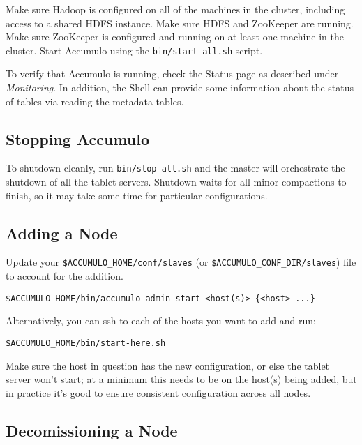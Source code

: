 Make sure Hadoop is configured on all of the machines in the cluster, including
access to a shared HDFS instance. Make sure HDFS and ZooKeeper are running.
Make sure ZooKeeper is configured and running on at least one machine in the
cluster.
Start Accumulo using the \texttt{bin/start-all.sh} script.

To verify that Accumulo is running, check the Status page as described under
\emph{Monitoring}. In addition, the Shell can provide some information about the status of
tables via reading the metadata tables.

\subsection{Stopping Accumulo}

To shutdown cleanly, run \texttt{bin/stop-all.sh} and the master will orchestrate the
shutdown of all the tablet servers. Shutdown waits for all minor compactions to finish, so it may
take some time for particular configurations.

\subsection{Adding a Node}

Update your \texttt{\$ACCUMULO\_HOME/conf/slaves} (or \texttt{\$ACCUMULO\_CONF\_DIR/slaves}) file to account for the addition.

\begingroup\fontsize{8pt}{8pt}\selectfont\begin{verbatim}
$ACCUMULO_HOME/bin/accumulo admin start <host(s)> {<host> ...}
\end{verbatim}\endgroup

Alternatively, you can ssh to each of the hosts you want to add and run:

\begingroup\fontsize{8pt}{8pt}\selectfont\begin{verbatim}
$ACCUMULO_HOME/bin/start-here.sh
\end{verbatim}\endgroup

Make sure the host in question has the new configuration, or else the tablet 
server won't start; at a minimum this needs to be on the host(s) being added, 
but in practice it's good to ensure consistent configuration across all nodes.

\subsection{Decomissioning a Node}

